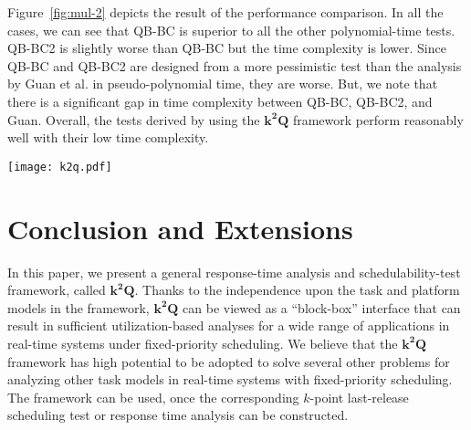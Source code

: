 \documentclass[10pt,conference]{IEEEtran}
\newcommand{\frameworkkq}[1]{$\mathbf{k^2Q}$}
\begin{document}
Figure~\ref{fig:mul-2} depicts the result of the performance
comparison. In all the cases, we can see that QB-BC is superior to all
the other polynomial-time tests.  QB-BC2 is slightly worse than QB-BC
but the time complexity is lower.  Since QB-BC and QB-BC2 are designed
from a more pessimistic test than the analysis by Guan et
al. \cite{DBLP:conf/rtss/GuanSYY09} in pseudo-polynomial time, they 
are worse. But, we note that
there is a significant gap in time complexity between QB-BC, QB-BC2,
and Guan.  Overall, the tests derived by using the \frameworkkq{}
framework perform reasonably well with their low time complexity.


\begin{figure*}[t]
  \centering
  \texttt{[image: k2q.pdf]}
  \caption{Acceptance ratio comparison on implicit-deadline 8 multiprocessor systems.}
  \label{fig:mul-2}
\end{figure*}


\section{Conclusion and Extensions}

In this paper, we present a general response-time analysis and
schedulability-test framework, called \frameworkkq{}. Thanks to the independence
upon the task and platform models in the framework, \frameworkkq{} can be viewed as a
``block-box'' interface that can result in sufficient
utilization-based analyses for a wide range of applications in
real-time systems under fixed-priority scheduling.  We believe that
the \frameworkkq{} framework has high potential to be adopted to solve
several other problems for analyzing other task models in real-time
systems with fixed-priority scheduling.  The framework can be used,
once the corresponding $k$-point last-release scheduling test or
response time analysis can be constructed.  
\end{document}
